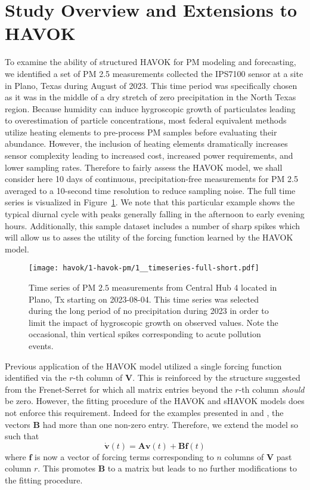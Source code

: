 \section{Study Overview and Extensions to HAVOK}

To examine the ability of structured HAVOK for PM modeling and
forecasting, we identified a set of PM 2.5 measurements collected the IPS7100 sensor
at a site in Plano, Texas during August of 2023. This time period was specifically
chosen as it was in the middle of a dry stretch of zero precipitation in the
North Texas region. Because humidity can induce hygroscopic growth of
particulates leading to overestimation of particle concentrations, most federal
equivalent methods utilize heating elements to pre-process PM samples
before evaluating their abundance. However, the inclusion of heating elements
dramatically increases sensor complexity leading to increased cost, increased
power requirements, and lower sampling rates. Therefore to fairly assess the
HAVOK model, we shall consider here 10 days of continuous, precipitation-free
measurements for PM 2.5 averaged to a 10-second time resolution to reduce
sampling noise. The full time series is visualized in
Figure~\ref{fig:pm-timeseries-orig}. We note that this particular example shows
the typical diurnal cycle with peaks  generally falling in the afternoon
to early evening hours. Additionally, this sample dataset includes a number of
sharp spikes which will allow us to asses the utility of the forcing function
learned by the HAVOK model.

\begin{figure}[h]
  \centering
  \texttt{[image: havok/1-havok-pm/1\_\_timeseries-full-short.pdf]}
  \caption{Time series of PM $2.5$ measurements from Central Hub 4 located in
    Plano, Tx starting on 2023-08-04. This time series was selected during the
    long period of no precipitation during 2023 in order to limit the impact of
    hygroscopic growth on observed values. Note the occasional, thin vertical
    spikes corresponding to acute pollution events.}
  \label{fig:pm-timeseries-orig}
\end{figure}

Previous application of the HAVOK model utilized a single forcing function
identified via the $r$-th column of $\mathbf{V}$. This is reinforced by the
structure suggested from the Frenet-Serret for which all matrix entries beyond
the $r$-th column \textit{should} be zero. However, the fitting procedure of the
HAVOK and sHAVOK models does not enforce this requirement. Indeed for the
examples presented in \cite{brunton-havok-orig} and \cite{havok-diffgeo}, the
vectors $\mathbf{B}$ had more than one non-zero entry. Therefore, we extend the
model so such that
\begin{equation}
  \dot{\mathbf{v}}(t) = \mathbf{A}\mathbf{v}(t) + \mathbf{B}\mathbf{f}(t)
\end{equation}
where $\mathbf{f}$ is now a vector of forcing terms corresponding to $n$ columns
of $\mathbf{V}$ past column $r$. This promotes $\mathbf{B}$ to a matrix but
leads to no further modifications to the fitting procedure.

